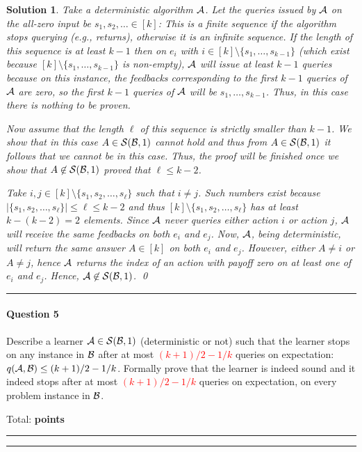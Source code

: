 \documentclass{article}
\DeclareMathOperator*{\1}{\mathbbm{1}}
\newcounter{DocPoints} %
\newcounter{QuestionPoints} %
\newcommand{\tpoints}[1]{        %
	\ifthenelse{\isempty{#1}}%
	{%
	}%
	{%
		\addtocounter{DocPoints}{#1}
		\addtocounter{QuestionPoints}{#1}
	}													 %
	\par\mbox{}\par\noindent\hfill {Total: \bf \arabic{QuestionPoints}\xspace points}\par\mbox{}\par\hrule\hrule
	\setcounter{QuestionPoints}{0}
}
\newtheorem*{solution*}{Solution}
\begin{document}
\begin{solution*}
Take a deterministic algorithm $\mathcal{A}$.
Let the queries issued by $\mathcal{A}$ on the all-zero input be $s_1,s_2,\dots\in [k]$: 
This is a finite sequence if the algorithm stops querying (e.g., returns), otherwise it is an infinite sequence.
If the length of this sequence is at least $k-1$ then on $e_i$ with $i\in [k]\setminus \{s_1,\dots,s_{k-1}\}$ (which exist because $[k]\setminus \{s_1,\dots,s_{k-1}\}$ is non-empty), $\mathcal{A}$ will issue at least $k-1$ queries because on this instance, the feedbacks corresponding to the first $k-1$ queries of $\mathcal{A}$ are zero, so the first $k-1$ queries of $\mathcal{A}$ will be $s_1,\dots,s_{k-1}$.
Thus, in this case there is nothing to be proven.

Now assume that the length $\ell$ of this sequence is strictly smaller than $k-1$. We show that in this case $A\in \mathcal{S}(\mathcal{B},1)$ cannot hold and thus from $A\in \mathcal{S}(\mathcal{B},1)$ it follows that we cannot be in this case.
Thus, the proof will be finished once we show that $A\not\in \mathcal{S}(\mathcal{B},1)$ proved that $\ell\le k-2$.

Take $i,j\in [k]\setminus \{s_1,s_2,\dots,s_{\ell}\}$ such that $i\ne j$.
Such numbers exist because $|\{s_1,s_2,\dots,s_{\ell}\}|\le \ell \le k-2$ and thus
$[k]\setminus \{s_1,s_2,\dots,s_\ell\}$ has at least $k-(k-2)=2$ elements.
Since $\mathcal{A}$ never queries either action $i$ or action $j$, $\mathcal{A}$ will receive the same feedbacks on both $e_i$ and $e_j$. 
Now, $\mathcal{A}$, being deterministic, will return the same answer $A\in [k]$ on both $e_i$ and $e_j$.
However, either $A\ne i$ or $A\ne j$, hence $\mathcal{A}$ returns the index of an action with payoff zero on at least one of $e_i$ and $e_j$. Hence, $\mathcal{A}\not\in \mathcal{S}(\mathcal{B},1)$.
\qed\par\bigskip\par\hrule
\end{solution*}


\paragraph{Question 5} 
Describe a learner $\mathcal{A}\in \mathcal{S}(\mathcal{B},1)$ (deterministic or not) such that the learner stops on any instance in $\mathcal{B}$ after at most \textcolor{red}{$(k+1)/2 - 1/k$} queries on expectation: \textcolor{red}{$q(\mathcal{A},\mathcal{B})\le (k+1)/2 - 1/k$}. 
Formally prove that the learner is indeed sound and it indeed stops after at most \textcolor{red}{$(k+1)/2 -1/k$} queries on expectation, on every problem instance in $\mathcal{B}$.
\tpoints{15}
\end{document}
